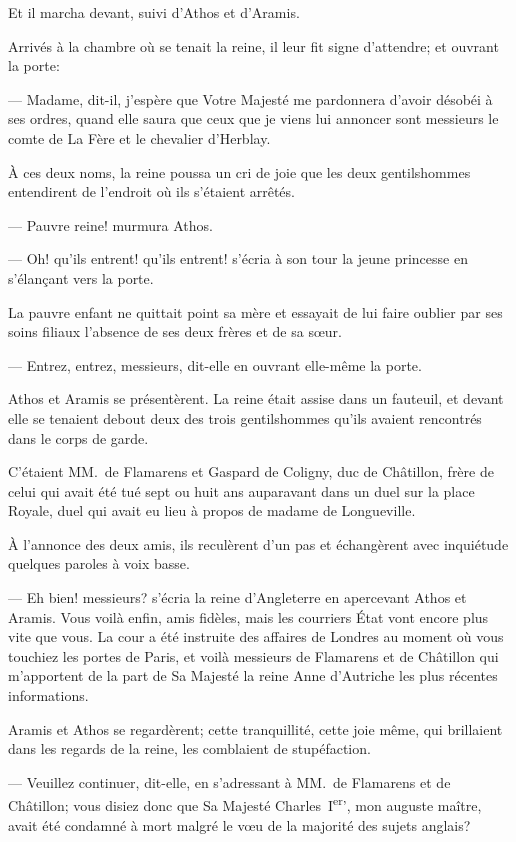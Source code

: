 Et il marcha devant, suivi d'Athos et d'Aramis.

Arrivés à la chambre où se tenait la reine, il leur fit signe d'attendre; et ouvrant la porte:

— Madame, dit-il, j'espère que Votre Majesté me pardonnera d'avoir désobéi à ses ordres, quand elle saura que ceux que je viens lui annoncer sont messieurs le comte de La Fère et le chevalier d'Herblay.

À ces deux noms, la reine poussa un cri de joie que les deux gentilshommes entendirent de l'endroit où ils s'étaient arrêtés.

— Pauvre reine! murmura Athos.

— Oh! qu'ils entrent! qu'ils entrent! s'écria à son tour la jeune princesse en s'élançant vers la porte.

La pauvre enfant ne quittait point sa mère et essayait de lui faire oublier par ses soins filiaux l'absence de ses deux frères et de sa sœur.

— Entrez, entrez, messieurs, dit-elle en ouvrant elle-même la porte.

Athos et Aramis se présentèrent. La reine était assise dans un fauteuil, et devant elle se tenaient debout deux des trois gentilshommes qu'ils avaient rencontrés dans le corps de garde.

C'étaient MM.~de Flamarens et Gaspard de Coligny, duc de Châtillon, frère de celui qui avait été tué sept ou huit ans auparavant dans un duel sur la place Royale, duel qui avait eu lieu à propos de madame de Longueville.

À l'annonce des deux amis, ils reculèrent d'un pas et échangèrent avec inquiétude quelques paroles à voix basse.

— Eh bien! messieurs? s'écria la reine d'Angleterre en apercevant Athos et Aramis. Vous voilà enfin, amis fidèles, mais les courriers État vont encore plus vite que vous. La cour a été instruite des affaires de Londres au moment où vous touchiez les portes de Paris, et voilà messieurs de Flamarens et de Châtillon qui m'apportent de la part de Sa Majesté la reine Anne d'Autriche les plus récentes informations.

Aramis et Athos se regardèrent; cette tranquillité, cette joie même, qui brillaient dans les regards de la reine, les comblaient de stupéfaction.

— Veuillez continuer, dit-elle, en s'adressant à MM.~de Flamarens et de Châtillon; vous disiez donc que Sa Majesté Charles~I\textsuperscript{er}', mon auguste maître, avait été condamné à mort malgré le vœu de la majorité des sujets anglais?

